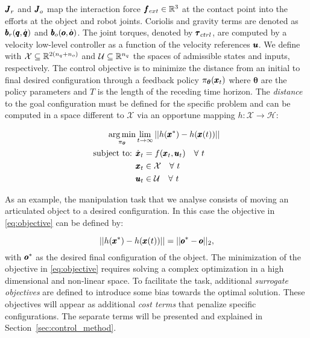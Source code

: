 $\pmb{J}_r$ and $\pmb{J}_o$ map the interaction force $\pmb{f}_{ext} \in \mathbb{R}^{3}$ at the contact point into the efforts at the object and robot joints. Coriolis and gravity terms are denoted as $\pmb{b}_{r}(\pmb{q}, \dot{\pmb{q}})$ and $\pmb{b}_{o}(\pmb{o}, \dot{\pmb{o}})$. 
The joint torques, denoted by $\pmb{\tau}_{ctrl}$, are computed by a velocity low-level controller as a function of the velocity references $\pmb{u}$. We define with  $\mathcal{X} \subseteq \mathbb{R}^{2(n_q + n_o)}$ and $\mathcal{U} \subseteq \mathbb{R}^{n_q}$ the spaces of admissible states and inputs, respectively. The control objective is to minimize the distance from an initial to final desired configuration through a feedback policy $\pi_{\boldsymbol{\theta}}(\pmb{x}_t)$ where $\boldsymbol{\theta}$ are the policy parameters and $T$ is the length of the receding time horizon. The \textit{distance} to the goal configuration must be defined for the specific problem and can be computed in a space different to $\mathcal{X}$ via an opportune mapping $h : \mathcal{X} \rightarrow \mathcal{H}$: 

\begin{equation} \label{eq:objective}
\begin{aligned}
\underset{\pi_{\boldsymbol{\theta}}}{\arg \min}&  \lim_{t \rightarrow \infty} || h(\pmb{x}^*) - h(\pmb{x}(t)) ||\\
\text{subject to: } & \dot{\pmb{x}}_t=f(\pmb{x}_t, \pmb{u}_t) \quad \forall \ t\\
                    & \pmb{x}_t  \in \mathcal{X}         \quad \forall \ t \\
                    & \pmb{u}_t \in \mathcal{U}        \quad \forall \ t
\end{aligned}
\end{equation}

As an example, the manipulation task that we analyse consists of moving an articulated object to a desired configuration. In this case the objective in \eqref{eq:objective} can be defined by:


\begin{equation}
   || h(\pmb{x}^*) - h(\pmb{x}(t)) || = || \pmb{o}^* - \pmb{o} ||_2,
\end{equation}
with $\pmb{o}^*$ as the desired final configuration of the object. The minimization of the objective in \eqref{eq:objective} requires solving a complex optimization in a high dimensional and non-linear space. To facilitate the task, additional \textit{surrogate objectives} are defined to introduce some bias towards the optimal solution. These objectives will appear as additional \textit{cost terms} that penalize specific configurations. The separate terms will be presented and explained in Section~\ref{sec:control_method}.
